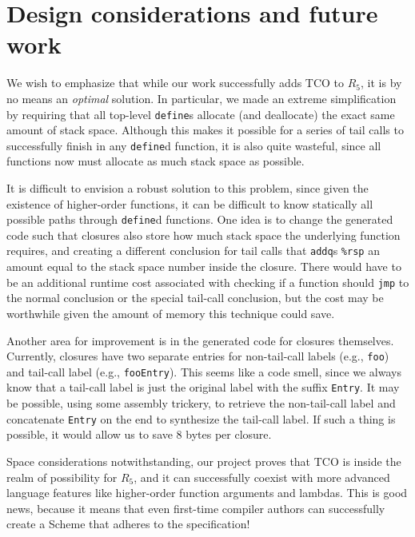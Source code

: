 \documentclass[12pt]{article}
\begin{document}
\section{Design considerations and future work}

We wish to emphasize that while our work successfully adds TCO to $R_5$, it is by
no means an \textit{optimal} solution. In particular, we made an extreme simplification
by requiring that all top-level \verb+define+s allocate (and deallocate) the exact
same amount of stack space. Although this makes it possible for a series of tail calls
to successfully finish in any \verb+define+d function, it is also quite wasteful, since
all functions now must allocate as much stack space as possible.

It is difficult to envision a robust solution to this problem, since given the existence
of higher-order functions, it can be difficult to know statically all possible paths
through \verb+define+d functions. One idea is to change the generated code such that
closures also store how much stack space the underlying function requires, and creating
a different conclusion for tail calls that \verb+addq+s \verb+%rsp+ an amount equal
to the stack space number inside the closure. There would have to be an additional
runtime cost associated with checking if a function should \verb+jmp+ to the normal
conclusion or the special tail-call conclusion, but the cost may be worthwhile
given the amount of memory this technique could save.

Another area for improvement is in the generated code for closures themselves.
Currently, closures have two separate entries for non-tail-call labels (e.g.,
\verb+foo+) and tail-call label (e.g., \verb+fooEntry+). This seems like a code
smell, since we always know that a tail-call label is just the original label with
the suffix \verb+Entry+. It may be possible, using some assembly trickery, to
retrieve the non-tail-call label and concatenate \verb+Entry+ on the end to
synthesize the tail-call label. If such a thing is possible, it would allow us
to save 8 bytes per closure.

Space considerations notwithstanding, our project proves that TCO is inside the
realm of possibility for $R_5$, and it can successfully coexist with more advanced
language features like higher-order function arguments and lambdas. This is good
news, because it means that even first-time compiler authors can successfully
create a Scheme that adheres to the specification!
\end{document}
